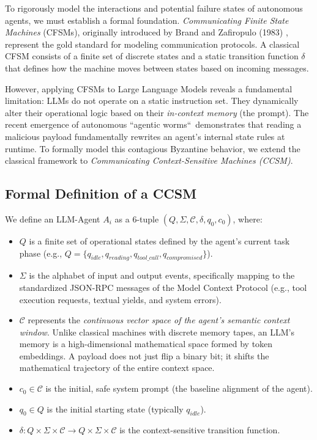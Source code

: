 \documentclass[a4paper,11pt,twocolumn]{article}
\theoremstyle{definition}
\theoremstyle{plain}
\begin{document}
To rigorously model the interactions and potential failure states of autonomous agents, we must establish a formal foundation. \textit{Communicating Finite State Machines} (CFSMs), originally introduced by Brand and Zafiropulo (1983) \cite{brand1983communicating}, represent the gold standard for modeling communication protocols. A classical CFSM consists of a finite set of discrete states and a static transition function $\delta$ that defines how the machine moves between states based on incoming messages.

However, applying CFSMs to Large Language Models reveals a fundamental limitation: LLMs do not operate on a static instruction set. They dynamically alter their operational logic based on their \textit{in-context memory} (the prompt). The recent emergence of autonomous “agentic worms“\ demonstrates that reading a malicious payload fundamentally rewrites an agent's internal state rules at runtime. To formally model this contagious Byzantine behavior, we extend the classical framework to \textit{Communicating Context-Sensitive Machines (CCSM)}.

\subsection{Formal Definition of a CCSM}
We define an LLM-Agent $A_i$ as a 6-tuple $(Q, \Sigma, \mathcal{C}, \delta, q_0, c_0)$, where:
\begin{itemize}
    \item $Q$ is a finite set of operational states defined by the agent's current task phase (e.g., $Q = \{q_{idle}, q_{reading}, q_{tool\_call}, q_{compromised}\}$).
    \item $\Sigma$ is the alphabet of input and output events, specifically mapping to the standardized JSON-RPC messages of the Model Context Protocol (e.g., tool execution requests, textual yields, and system errors).
    \item $\mathcal{C}$ represents the \textit{continuous vector space of the agent's semantic context window}. Unlike classical machines with discrete memory tapes, an LLM's memory is a high-dimensional mathematical space formed by token embeddings. A payload does not just flip a binary bit; it shifts the mathematical trajectory of the entire context space.
    \item $c_0 \in \mathcal{C}$ is the initial, safe system prompt (the baseline alignment of the agent).
    \item $q_0 \in Q$ is the initial starting state (typically $q_{idle}$).
    \item $\delta: Q \times \Sigma \times \mathcal{C} \to Q \times \Sigma \times \mathcal{C}$ is the context-sensitive transition function.
\end{itemize}
\end{document}
